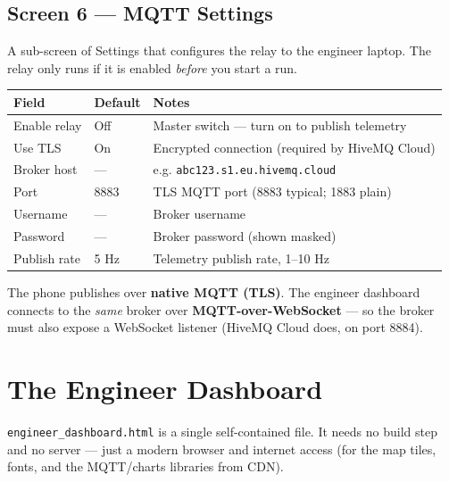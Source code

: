 \documentclass[11pt,a4paper,oneside]{report}
\newcommand{\code}[1]{\texttt{#1}}
\begin{document}
\subsection{Screen 6 --- MQTT Settings}
A sub-screen of Settings that configures the relay to the engineer laptop. The
relay only runs if it is enabled \emph{before} you start a run.

\begin{tabularx}{\linewidth}{@{}llL@{}}
\toprule
\textbf{Field} & \textbf{Default} & \textbf{Notes}\\
\midrule
Enable relay & Off & Master switch --- turn on to publish telemetry\\
Use TLS & On & Encrypted connection (required by HiveMQ Cloud)\\
Broker host & --- & e.g. \code{abc123.s1.eu.hivemq.cloud}\\
Port & 8883 & TLS MQTT port (8883 typical; 1883 plain)\\
Username & --- & Broker username\\
Password & --- & Broker password (shown masked)\\
Publish rate & 5 Hz & Telemetry publish rate, 1--10 Hz\\
\bottomrule
\end{tabularx}
\begin{tgnote}
The phone publishes over \textbf{native MQTT (TLS)}. The engineer dashboard
connects to the \emph{same} broker over \textbf{MQTT-over-WebSocket} --- so the
broker must also expose a WebSocket listener (HiveMQ Cloud does, on port 8884).
\end{tgnote}

\section{The Engineer Dashboard}
\code{engineer\_dashboard.html} is a single self-contained file. It needs no build
step and no server --- just a modern browser and internet access (for the map
tiles, fonts, and the MQTT/charts libraries from CDN).
\end{document}
